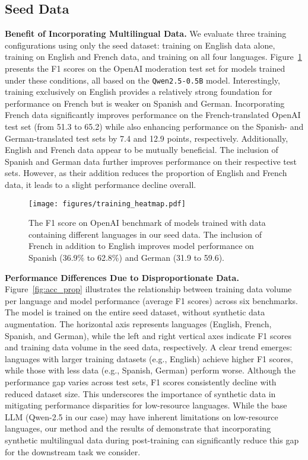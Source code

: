 \subsection{Seed Data}
\textbf{Benefit of Incorporating Multilingual Data.} 
We evaluate three training configurations using only the seed dataset: training on English data alone, training on English and French data, and training on all four languages. Figure~\ref{fig:training_heatmap} presents the F1 scores on the OpenAI moderation test set for models trained under these conditions, all based on the \texttt{Qwen2.5-0.5B} model.  
Interestingly, training exclusively on English provides a relatively strong foundation for performance on French but is weaker on Spanish and German. Incorporating French data significantly improves performance on the French-translated OpenAI test set (from 51.3 to 65.2) while also enhancing performance on the Spanish- and German-translated test sets by 7.4 and 12.9 points, respectively. Additionally, English and French data appear to be mutually beneficial. 
The inclusion of Spanish and German data further improves performance on their respective test sets. However, as their addition reduces the proportion of English and French data, it leads to a slight performance decline overall.

\begin{figure}[!ht]
    \centering
    \texttt{[image: figures/training\_heatmap.pdf]}
    \vspace{-3mm}
    \caption{The F1 score on OpenAI benchmark of models trained with data containing different languages in our seed data. The inclusion of French in addition to English improves model performance on Spanish (36.9\% to 62.8\%) and German (31.9 to 59.6).}
    \label{fig:training_heatmap}
\end{figure}

\textbf{Performance Differences Due to Disproportionate Data.}  
Figure~\ref{fig:acc_prop} illustrates the relationship between training data volume per language and model performance (average F1 scores) across six benchmarks. The model is trained on the entire seed dataset, without synthetic data augmentation. The horizontal axis represents languages (English, French, Spanish, and German), while the left and right vertical axes indicate F1 scores and training data volume in the seed data, respectively.  
A clear trend emerges: languages with larger training datasets (e.g., English) achieve higher F1 scores, while those with less data (e.g., Spanish, German) perform worse. Although the performance gap varies across test sets, F1 scores consistently decline with reduced dataset size. This underscores the importance of synthetic data in mitigating performance disparities for low-resource languages.  
While the base LLM (Qwen-2.5 in our case) may have inherent limitations on low-resource languages, our method and the results of \ours demonstrate that incorporating synthetic multilingual data during post-training can significantly reduce this gap for the downstream task we consider.  

